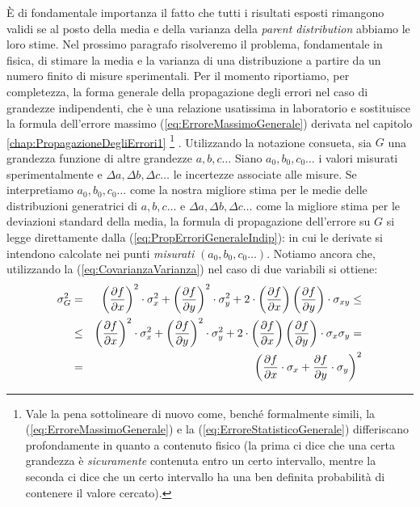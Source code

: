 \`E di fondamentale importanza il fatto che tutti i risultati esposti
rimangono validi se al posto della media e della
varianza della \emph{parent distribution} abbiamo le loro stime.
Nel prossimo paragrafo risolveremo il problema, fondamentale in fisica,
di stimare la media e la varianza di una distribuzione a partire da un numero
finito di misure sperimentali.
Per il momento riportiamo, per completezza, la forma generale della
propagazione degli errori nel caso di grandezze indipendenti, che \`e una
relazione usatissima in laboratorio e sostituisce la formula dell'errore
massimo (\ref{eq:ErroreMassimoGenerale}) derivata nel capitolo
{\ref{chap:PropagazioneDegliErrori1}}%
\renewcommand{\thefootnote}{\fnsymbol{footnote}}
\footnote{
Vale la pena sottolineare di nuovo come, bench\'e formalmente simili,
la (\ref{eq:ErroreMassimoGenerale}) e la (\ref{eq:ErroreStatisticoGenerale})
differiscano profondamente in quanto a contenuto fisico (la prima ci dice che
una certa grandezza \`e {\itshape sicuramente} contenuta entro un
certo intervallo, mentre la seconda ci dice che un certo intervallo ha una
ben definita probabilit\`a di contenere il valore cercato).
}%
\renewcommand{\thefootnote}{\arabic{footnote}}
.
Utilizzando la notazione consueta, sia $G$ una grandezza funzione di altre
grandezze $a, b, c \ldots$ Siano $a_0, b_0, c_0 \ldots$ i valori misurati
sperimentalmente e $\Delta a, \Delta b, \Delta c \ldots$ le incertezze
associate alle misure. Se interpretiamo $a_0, b_0, c_0 \ldots$ come la nostra
migliore stima per le medie delle distribuzioni generatrici di
$a, b, c \ldots $ e $\Delta a, \Delta b, \Delta c \ldots$
come la migliore stima per le deviazioni standard della media, la formula di
propagazione dell'errore su $G$ si legge direttamente dalla
(\ref{eq:PropErroriGeneraleIndip}):
in cui le derivate si intendono calcolate nei punti \emph{misurati}
$(a_0, b_0, c_0 \ldots)$.
Notiamo ancora che, utilizzando la (\ref{eq:CovarianzaVarianza})
nel caso di due variabili si ottiene:
\begin{eqnarray*}
\sigma_G^2 & = &
\left(\displaystyle \frac{\partial f}{\partial x} \right)^2 \cdot \sigma^2_x +
\left(\displaystyle \frac{\partial f}{\partial y} \right)^2 \cdot \sigma^2_y +
2 \cdot \left(\displaystyle \frac{\partial f}{\partial x} \right) \left(\displaystyle \frac{\partial f}{\partial y} \right)
\cdot \sigma_{xy} \le\\
& \le & \left(\displaystyle \frac{\partial f}{\partial x} \right)^2 \cdot \sigma^2_x +
\left(\displaystyle \frac{\partial f}{\partial y} \right)^2 \cdot \sigma^2_y +
2 \cdot \left(\displaystyle \frac{\partial f}{\partial x} \right)
\left(\displaystyle \frac{\partial f}{\partial y} \right) \cdot \sigma_x \sigma_y =\\
& = & \left( \displaystyle \frac{\partial f}{\partial x} \cdot \sigma_x +
\displaystyle \frac{\partial f}{\partial y} \cdot \sigma_y \right)^2
\end{eqnarray*}
